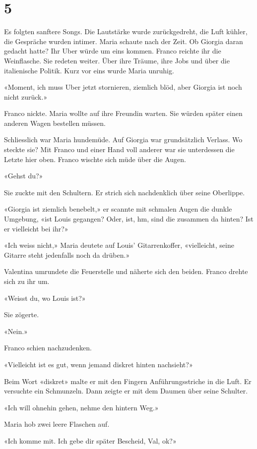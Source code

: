\chapter{5}



Es folgten sanftere Songs. Die Lautstärke wurde zurückgedreht, die Luft
kühler, die Gespräche wurden intimer.
Maria schaute nach der Zeit. Ob Giorgia daran gedacht hatte? Ihr Uber
würde um eins kommen. Franco reichte ihr die Weinflasche. Sie redeten
weiter. Über ihre Träume, ihre Jobs und über die italienische Politik.
Kurz vor eins wurde Maria unruhig.

«Moment, ich muss Uber jetzt stornieren, ziemlich blöd, aber Giorgia ist noch nicht zurück.»

Franco nickte. Maria wollte auf ihre Freundin warten. Sie würden später einen anderen Wagen bestellen müssen.

Schliesslich war Maria hundemüde. Auf Giorgia war grundsätzlich Verlass.
Wo steckte sie? Mit Franco und einer Hand voll anderer war sie
unterdessen die Letzte hier oben.
Franco wischte sich müde über die Augen.

«Gehst du?»

Sie zuckte mit den Schultern.
Er strich sich nachdenklich über seine Oberlippe.

«Giorgia ist ziemlich benebelt,» er scannte mit schmalen Augen die
dunkle Umgebung, «ist Louis gegangen? Oder, ist, hm, sind die zusammen
da hinten? Ist er vielleicht bei ihr?»

«Ich weiss nicht,» Maria deutete auf Louis’ Gitarrenkoffer, «vielleicht,
seine Gitarre steht jedenfalls noch da drüben.»

Valentina umrundete die Feuerstelle und näherte sich den beiden.
Franco drehte sich zu ihr um.

«Weisst du, wo Louis ist?»

Sie zögerte.

«Nein.»

Franco schien nachzudenken.

«Vielleicht ist es gut, wenn jemand diskret hinten
nachsieht?»

Beim Wort «diskret» malte er mit den Fingern Anführungsstriche in die
Luft. Er versuchte ein Schmunzeln.
Dann zeigte er mit dem Daumen über seine Schulter.

«Ich will ohnehin gehen, nehme den hintern Weg.»

Maria hob zwei leere Flaschen auf.

«Ich komme mit. Ich gebe dir später Bescheid, Val, ok?»


